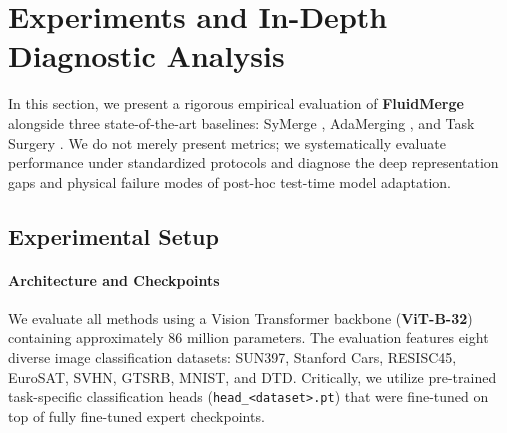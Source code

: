 \section{Experiments and In-Depth Diagnostic Analysis}
\label{sec:experiments}

In this section, we present a rigorous empirical evaluation of \textbf{FluidMerge} alongside three state-of-the-art baselines: SyMerge \cite{jung2025symerge}, AdaMerging \cite{yang2024adamerging}, and Task Surgery \cite{zhang2024task}. We do not merely present metrics; we systematically evaluate performance under standardized protocols and diagnose the deep representation gaps and physical failure modes of post-hoc test-time model adaptation.

\subsection{Experimental Setup}

\paragraph{Architecture and Checkpoints}
We evaluate all methods using a Vision Transformer backbone (\textbf{ViT-B-32}) \cite{dosovitskiy2020image, radford2021clip} containing approximately 86 million parameters. The evaluation features eight diverse image classification datasets: SUN397, Stanford Cars, RESISC45, EuroSAT, SVHN, GTSRB, MNIST, and DTD. Critically, we utilize pre-trained task-specific classification heads (\texttt{head\_<dataset>.pt}) that were fine-tuned on top of fully fine-tuned expert checkpoints. 

